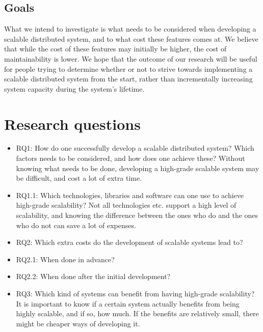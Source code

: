 \documentclass{article}
\begin{document}
\subsection{Goals} 

What we intend to investigate is what needs to be considered
when developing a scalable distributed system, and to what cost these features
comes at. We believe that while the cost of these features may initially be
higher, the cost of maintainability is lower. We hope that the outcome of our
research will be useful for people trying to determine whether or not to strive
towards implementing a scalable distributed system from the start, rather than
incrementally increasing system capacity during the system's lifetime.

\newpage

\section{Research questions}

\begin{itemize}
\item{RQ1: How do one successfully develop a scalable distributed system? Which
factors needs to be considered, and how does one achieve these? Without knowing
what needs to be done, developing a high-grade scalable system may be
difficult, and cost a lot of extra time.} 

\item{RQ1.1: Which technologies, libraries and software can one use to achieve
high-grade scalability? Not all technologies etc. support a high level of
scalability, and knowing the difference between the ones who do and the ones
who do not can save a lot of expenses.}

\item{RQ2: Which extra costs do the development of scalable systems lead to?} 
\item{RQ2.1: When done in advance?} 
\item{RQ2.2: When done after the initial development?} 

\item{RQ3: Which kind of systems can benefit from having high-grade scalability?
It is important to know if a certain system actually benefits from being highly
scalable, and if so, how much. If the benefits are relatively small, there 
might be cheaper ways of developing it.}


\end{itemize}
\end{document}
